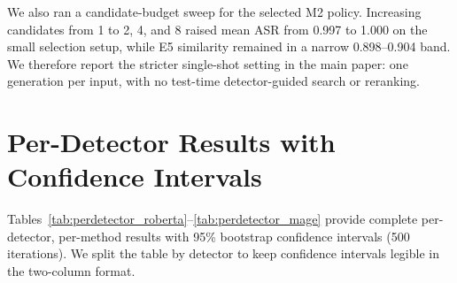 \documentclass[11pt]{article}
\begin{document}
We also ran a candidate-budget sweep for the selected M2 policy. Increasing candidates from 1 to 2, 4, and 8 raised mean ASR from 0.997 to 1.000 on the small selection setup, while E5 similarity remained in a narrow 0.898--0.904 band. We therefore report the stricter single-shot setting in the main paper: one generation per input, with no test-time detector-guided search or reranking.

\FloatBarrier
\section{Per-Detector Results with Confidence Intervals}
\label{app:perdetector}

Tables~\ref{tab:perdetector_roberta}--\ref{tab:perdetector_mage} provide complete per-detector, per-method results with 95\% bootstrap confidence intervals (500 iterations). We split the table by detector to keep confidence intervals legible in the two-column format.

\begin{center}
\footnotesize
\setlength{\tabcolsep}{4pt}
\resizebox{\columnwidth}{!}{%
  
}
\label{tab:perdetector_roberta}
\end{center}

\begin{center}
\footnotesize
\setlength{\tabcolsep}{4pt}
\resizebox{\columnwidth}{!}{%
  
}
\label{tab:perdetector_fastdetectgpt}
\end{center}

\begin{center}
\footnotesize
\setlength{\tabcolsep}{4pt}
\resizebox{\columnwidth}{!}{%
  
}
\label{tab:perdetector_binoculars}
\end{center}

\begin{center}
\footnotesize
\setlength{\tabcolsep}{4pt}
\resizebox{\columnwidth}{!}{%
  
}
\label{tab:perdetector_mage}
\end{center}
\end{document}
